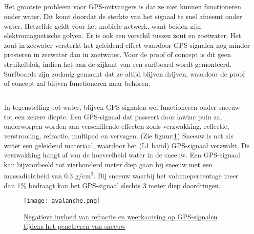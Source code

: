 \subsection{}
Het grootste probleem voor GPS-ontvangers is dat ze niet kunnen functioneren onder water. Dit komt doordat de sterkte van het signaal te snel afneemt onder water. Hetzelfde geldt voor het mobiele netwerk, want beiden zijn elektromagnetische golven. \autocite{underwater} Er is ook een verschil tussen zout en zoetwater. Het zout in zeewater versterkt het geleidend effect waardoor GPS-signalen nog minder presteren in zeewater dan in zoetwater. Voor de proof of concept is dit geen struikelblok, indien het aan de zijkant van een surfboard wordt gemonteerd. Surfboards zijn zodanig gemaakt dat ze altijd blijven drijven, waardoor de proof of concept zal blijven functioneren naar behoren.
\subsection{}
In tegenstelling tot water, blijven GPS-signalen wel functioneren onder sneeuw tot een zekere diepte. Een GPS-signaal dat passeert door lawine puin zal onderworpen worden aan verschillende effecten zoals verzwakking, reflectie, verstrooiing, refractie, multipad en vervagen. (Zie figuur:\ref{fig:avalanche}) Sneeuw is net als water een geleidend materiaal, waardoor het (L1 band) GPS-signaal verzwakt. De verzwakking hangt af van de hoeveelheid water in de sneeuw. Een GPS-signaal kan bijvoorbeeld tot vierhonderd meter diep gaan bij sneeuw met een massadichtheid van 0.3 g/cm\textsuperscript{3}. Bij sneeuw waarbij het volumepercentage meer dan 1\% bedraagt kan het GPS-signaal slechts 3 meter diep doordringen.\autocite{avalanche_gps}
\begin{figure}
    \texttt{[image: avalanche.png]}
    \caption[Negatieve invloed van refractie en weerkaatsing op GPS-signalen tijdens het penetreren van sneeuw]{\href{https://www.researchgate.net/figure/Signal-Paths-in-Avalanche-Debris_fig1_253280455}{Negatieve invloed van refractie en weerkaatsing op GPS-signalen tijdens het penetreren van sneeuw \autocite{avalanche_gps}}}
    \label{fig:avalanche}
\end{figure}
\pagebreak